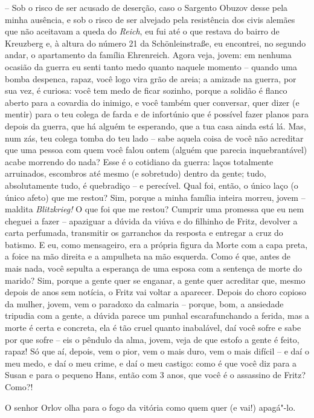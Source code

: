 -- Sob o risco de ser acusado de deserção, caso o Sargento Obuzov desse
pela minha ausência, e sob o risco de ser alvejado pela resistência dos
civis alemães que não aceitavam a queda do \emph{Reich}, eu fui até o
que restava do bairro de Kreuzberg e, à altura do número 21 da
Schönleinstraße, eu encontrei, no segundo andar, o apartamento da
família Ehrenreich. Agora veja, jovem: em nenhuma ocasião da guerra eu
senti tanto medo quanto naquele momento -- quando uma bomba despenca,
rapaz, você logo vira grão de areia; a amizade na guerra, por sua vez, é
curiosa: você tem medo de ficar sozinho, porque a solidão é flanco
aberto para a covardia do inimigo, e você também quer conversar, quer
dizer (e mentir) para o teu colega de farda e de infortúnio que é
possível fazer planos para depois da guerra, que há alguém te esperando,
que a tua casa ainda está lá. Mas, num zás, teu colega tomba do teu lado
-- sabe aquela coisa de você não acreditar que uma pessoa com quem você
falou ontem (alguém que parecia inquebrantável) acabe morrendo do nada?
Esse é o cotidiano da guerra: laços totalmente arruinados, escombros até
mesmo (e sobretudo) dentro da gente; tudo, absolutamente tudo, é
quebradiço -- e perecível. Qual foi, então, o único laço (o único afeto)
que me restou? Sim, porque a minha família inteira morreu, jovem --
maldita \emph{Blitzkrieg!} O que foi que me restou? Cumprir uma promessa
que eu nem cheguei a fazer -- apaziguar a dúvida da viúva e do filhinho
de Fritz, devolver a carta perfumada, transmitir os garranchos da
resposta e entregar a cruz do batismo. E eu, como mensageiro, era a
própria figura da Morte com a capa preta, a foice na mão direita e a
ampulheta na mão esquerda. Como é que, antes de mais nada, você sepulta
a esperança de uma esposa com a sentença de morte do marido? Sim, porque
a gente quer se enganar, a gente quer acreditar que, mesmo depois de
anos sem notícia, o Fritz vai voltar a aparecer. Depois do choro copioso
da mulher, jovem, vem o paradoxo da calmaria -- porque, bom, a ansiedade
tripudia com a gente, a dúvida parece um punhal escarafunchando a
ferida, mas a morte é certa e concreta, ela é tão cruel quanto
inabalável, daí você sofre e sabe por que sofre -- eis o pêndulo da
alma, jovem, veja de que estofo a gente é feito, rapaz! Só que aí,
depois, vem o pior, vem o mais duro, vem o mais difícil -- e daí o meu
medo, e daí o meu crime, e daí o meu castigo: como é que você diz para a
Susan e para o pequeno Hans, então com 3 anos, que você é o assassino de
Fritz? Como?!

O senhor Orlov olha para o fogo da vitória como quem quer (e vai!)
apagá"-lo.

